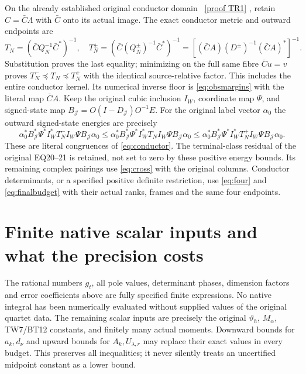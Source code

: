 \documentclass[11pt]{article}
\begin{document}
On the already established original conductor domain \cite{TR}%
~\href{https://github.com/KokunoYumeto/zeta-function-research-reader/blob/5992ad50c0f2a06921f1fcaded7b4e38097c0739/workbenches/splitzero-tandem/continuations/20260920-original-kernel-mixed-determinants/providers/NATIVE_TRUNCATION_CONDUCTOR_RETURN.tex\#L54}{[proof TR1]}%
{},
retain $C=\bar C\Lambda$ with $\bar C$ onto its actual image.
The exact conductor metric and outward endpoints are
\begin{equation}\label{eq:conductor}
 T_N=(\bar C Q_N^{-1}\bar C^*)^{-1},\quad
 T_N^\pm=(\bar C(Q_N^\pm)^{-1}\bar C^*)^{-1}
       =[(\bar CA)(D^\pm)^{-1}(\bar CA)^*]^{-1}.
\end{equation}
Substitution proves the last equality; minimizing on the full same
fibre $\bar Cu=v$ proves $T_N^-\preceq T_N\preceq T_N^+$
with the identical source-relative factor. This includes the entire
conductor kernel. Its numerical inverse floor is
\eqref{eq:obsmargins} with the literal map $\bar CA$.
Keep the original cubic inclusion $I_W$, coordinate map $\Psi$,
and signed-state map $B_{\mathcal J}=O(I-D_{\mathcal J})O^{-1}E$.
For the original label vector $\alpha_0$ the outward signed-state
energies are precisely
\[
 \alpha_0^*B_{\mathcal J}^*\Psi^*I_W^*T_N^-I_W\Psi
               B_{\mathcal J}\alpha_0
 \le\alpha_0^*B_{\mathcal J}^*\Psi^*I_W^*T_NI_W\Psi
               B_{\mathcal J}\alpha_0
 \le\alpha_0^*B_{\mathcal J}^*\Psi^*I_W^*T_N^+I_W\Psi
               B_{\mathcal J}\alpha_0.
\]
These are literal congruences of \eqref{eq:conductor}. The
terminal-class residual of the original EQ20--21 is retained,
not set to zero by these positive energy bounds. Its remaining
complex pairings use \eqref{eq:cross} with the original columns.
Conductor determinants, or a specified positive definite
restriction, use \eqref{eq:four} and \eqref{eq:finalbudget} with
their actual ranks, frames and the same four endpoints.

\section{Finite native scalar inputs and what the precision costs}

The rational numbers $g_t$, all pole values, determinant phases,
dimension factors and error coefficients above are fully specified
finite expressions. No native integral has been numerically
evaluated without supplied values of the original quartet data.
The remaining scalar inputs are precisely the original
$\vartheta_h$, $M_\alpha$, TW7/BT12 constants, and finitely many
actual moments. Downward bounds for $a_k,d_\nu$ and upward bounds
for $A_k,U_{\lambda,r}$ may replace their exact values in every
budget. This preserves all inequalities; it never silently treats
an uncertified midpoint constant as a lower bound.
\end{document}
